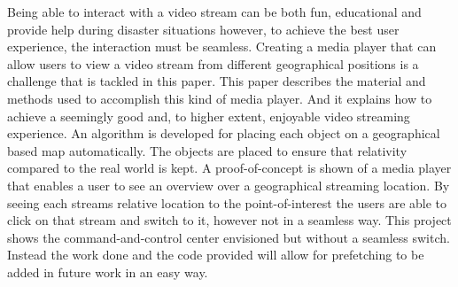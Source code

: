 Being able to interact with a video stream can be both fun, educational and provide help during disaster situations however, to achieve the best user experience, the interaction must be seamless. Creating a media player that can allow users to view a video stream from different geographical positions is a challenge that is tackled in this paper. This paper describes the material and methods used to accomplish this kind of media player. And it explains how to achieve a seemingly good and, to higher extent, enjoyable video streaming experience. An algorithm is developed for placing each object on a geographical based map automatically. The objects are placed to ensure that relativity compared to the real world is kept. A proof-of-concept is shown of a media player that enables a user to see an overview over a geographical streaming location. By seeing each streams relative location to the point-of-interest the users are able to click on that stream and switch to it, however not in a seamless way. This project shows the command-and-control center envisioned but without a seamless switch. Instead the work done and the code provided will allow for prefetching to be added in future work in an easy way.